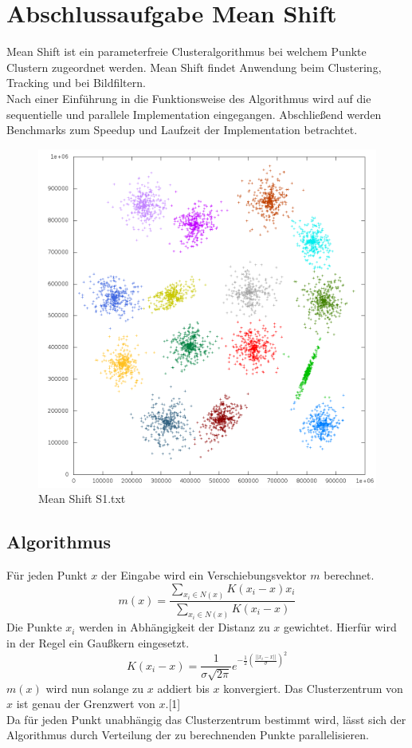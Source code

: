 \chapter{Abschlussaufgabe Mean Shift}
Mean Shift ist ein parameterfreie Clusteralgorithmus bei welchem Punkte Clustern zugeordnet werden. Mean Shift findet Anwendung beim Clustering,
Tracking und bei Bildfiltern.\\
Nach einer Einführung in die Funktionsweise des Algorithmus wird auf die sequentielle und parallele Implementation eingegangen.
Abschließend werden Benchmarks zum Speedup und Laufzeit der Implementation betrachtet.\\
\vspace{-10pt}
\begin{figure}[H]
	\centering
	\includegraphics[scale=0.61]{../meanshift/output/pics/s1_colored.png} 
	\vspace{-10pt}
	\caption{Mean Shift S1.txt}
\end{figure}
\section{Algorithmus}
	Für jeden Punkt $ x $ der Eingabe wird ein Verschiebungsvektor $ m $ berechnet. 
		\[ m(x) = \frac{\sum_{x_i \in N(x)} K(x_i - x) x_i }{\sum_{x_i \in N(x)} K(x_i - x)} \]
	Die Punkte $ x_i $ werden in Abhängigkeit der Distanz zu $ x $ gewichtet. Hierfür wird in der Regel ein Gaußkern eingesetzt.
		\[K(x_i - x) = \frac {1}{\sigma\sqrt{2\pi}} e^{-\frac {1}{2} \left(\frac{||x_i - x||}{\sigma}\right)^2}\]
	$ m(x) $ wird nun solange zu $ x $ addiert bis $ x $ konvergiert. Das Clusterzentrum von $ x $ ist genau der Grenzwert von $ x $.[1]\\
	Da für jeden Punkt unabhängig das Clusterzentrum bestimmt wird, lässt sich der Algorithmus durch Verteilung der zu berechnenden Punkte parallelisieren.\\
